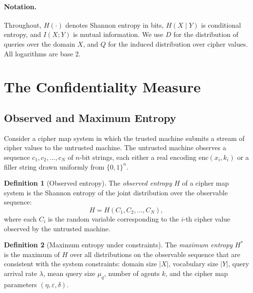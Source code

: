 \documentclass[11pt]{article}
\theoremstyle{definition}
\newtheorem{definition}{Definition}[section]
\theoremstyle{plain}
\theoremstyle{remark}
\newcommand{\enc}{\mathrm{enc}}
\newcommand{\B}{\{0,1\}}
\begin{document}
\paragraph{Notation.}
Throughout, $H(\cdot)$ denotes Shannon entropy in bits, $H(X \mid Y)$
is conditional entropy, and $I(X; Y)$ is mutual information.  We use
$D$ for the distribution of queries over the domain $X$, and $Q$ for
the induced distribution over cipher values.  All logarithms are base 2.


\section{The Confidentiality Measure}
\label{sec:measure}

\subsection{Observed and Maximum Entropy}

Consider a cipher map system in which the trusted machine submits a
stream of cipher values to the untrusted machine.  The untrusted machine
observes a sequence $c_1, c_2, \ldots, c_N$ of $n$-bit strings, each
either a real encoding $\enc(x_i, k_i)$ or a filler string drawn
uniformly from $\B^n$.

\begin{definition}[Observed entropy]
\label{def:observed-entropy}
The \emph{observed entropy} $H$ of a cipher map system is the Shannon
entropy of the joint distribution over the observable sequence:
\begin{equation}
H = H(C_1, C_2, \ldots, C_N),
\end{equation}
where each $C_i$ is the random variable corresponding to the $i$-th
cipher value observed by the untrusted machine.
\end{definition}

\begin{definition}[Maximum entropy under constraints]
\label{def:max-entropy}
The \emph{maximum entropy} $H^*$ is the maximum of $H$ over all
distributions on the observable sequence that are consistent with the
system constraints: domain size $|X|$, vocabulary size $|Y|$, query
arrival rate $\lambda$, mean query size $\mu_q$, number of agents $k$,
and the cipher map parameters $(\eta, \varepsilon, \delta)$.
\end{definition}
\end{document}
